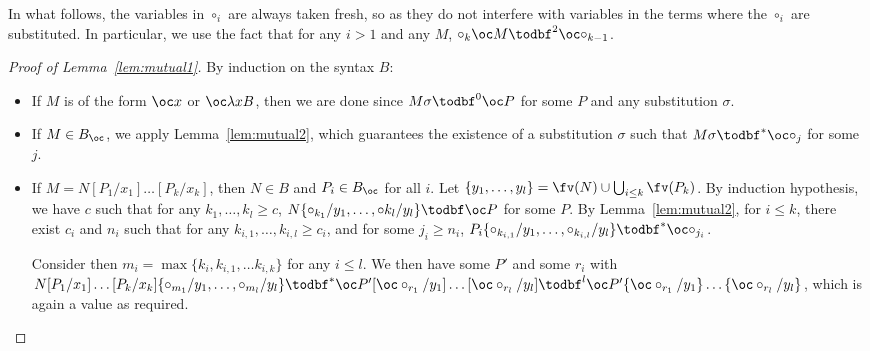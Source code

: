 In what follows, the variables in $\circ_i$ are always taken fresh, so as they
do not interfere with variables in the terms where the $\circ_i$ are
substituted. In particular, we use the fact that for any $i>1$ and any $M$, $\circ_k \oc
M\todbf^2\oc\circ_{k-1}$.

\begin{proof}[Proof of Lemma~\ref{lem:mutual1}]
	By induction on the syntax $B$:
	\begin{itemize}
		\item If $M$ is of the form $\oc x$ or $\oc\lambda xB$, then we are
			done since $M\sigma\todbf^0 \oc P$ for some $P$ and any
			substitution $\sigma$.
		\item If $M\in B_\oc$, we apply Lemma~\ref{lem:mutual2},
			which guarantees the existence of a substitution $\sigma$
			such that $M\sigma\todbf^*\oc\circ_j$ for some $j$.
		\item If $M=N[P_1/x_1]\dots [P_k/x_k]$, then $N\in B$ and $P_i\in
			B_\oc$ for all $i$. Let $\{y_1,\dots ,y_l\}=\fv(N)\cup\bigcup_{i\leq
			k}\fv(P_k)$. By induction hypothesis, we have
			$c$ such that for any $k_1,\dots ,k_l\geq c$,
			$N\{\circ_{k_1}/y_1,\dots ,\circ{k_l}/y_l\}\todbf \oc P$ for
			some $P$. By Lemma~\ref{lem:mutual2},
			for $i\leq k$, there exist $c_i$
			and $n_i$ such that for any $k_{i,1},\dots ,k_{i,l}\geq c_i$,
			and for some $j_i\geq n_i$,
			$P_i\{\circ_{k_{i,1}}/y_1,\dots ,\circ_{k_{i,l}}/y_l\}\todbf^*\oc\circ_{j_i}$.

			Consider then $m_i=\max\{k_i,k_{i,1},\dots k_{i,k}\}$ for any
			$i\leq l$. We then have some $P'$ and some $r_i$ with
			$N[P_1/x_1]\dots [P_k/x_k]\{\circ_{m_1}/y_1,\dots ,\circ_{m_l}/y_l\}\todbf^*
			\oc P' [\oc\circ_{r_1}/y_1]\dots [\oc\circ_{r_l}/y_l]\todbf^l 
			\oc P' \{\oc\circ_{r_1}/y_1\}\dots \{\oc\circ_{r_l}/y_l\}$,
			which is again a value as required. \qedhere
	\end{itemize}
\end{proof}

